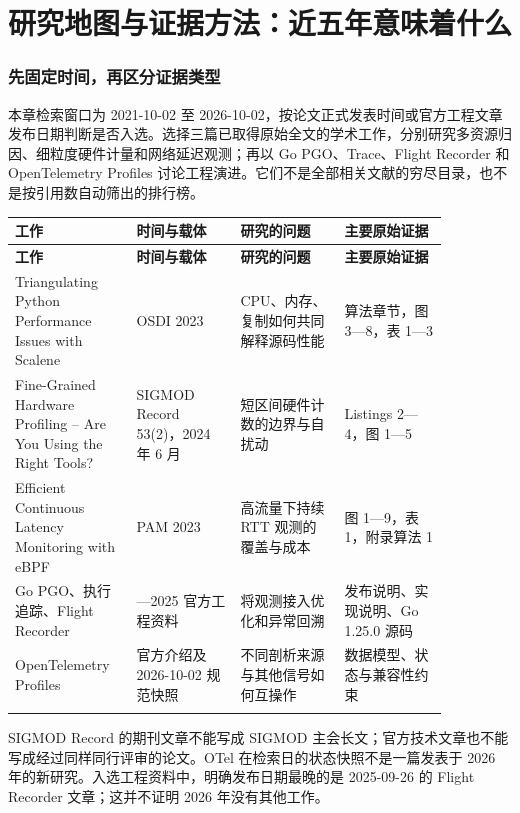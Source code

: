 \documentclass[UTF8,fontset=fandol,openany,11pt]{ctexbook}
\begin{document}
\section{研究地图与证据方法：近五年意味着什么}
\subsubsection{先固定时间，再区分证据类型}
本章检索窗口为 2021-10-02 至 2026-10-02，按论文正式发表时间或官方工程文章发布日期判断是否入选。选择三篇已取得原始全文的学术工作，分别研究多资源归因、细粒度硬件计量和网络延迟观测；再以 Go PGO、Trace、Flight Recorder 和 OpenTelemetry Profiles 讨论工程演进。它们不是全部相关文献的穷尽目录，也不是按引用数自动筛出的排行榜。

\begingroup\small\setlength{\tabcolsep}{4pt}
\begin{longtable}{>{\raggedright\arraybackslash}p{0.215\linewidth}>{\raggedright\arraybackslash}p{0.215\linewidth}>{\raggedright\arraybackslash}p{0.215\linewidth}>{\raggedright\arraybackslash}p{0.215\linewidth}}
\toprule
\textbf{工作} & \textbf{时间与载体} & \textbf{研究的问题} & \textbf{主要原始证据} \\
\midrule
\endfirsthead
\toprule
\textbf{工作} & \textbf{时间与载体} & \textbf{研究的问题} & \textbf{主要原始证据} \\
\midrule
\endhead
Triangulating Python Performance Issues with Scalene & OSDI 2023 & CPU、内存、复制如何共同解释源码性能 & 算法章节，图 3—8，表 1—3 \\
\addlinespace[3pt]
Fine-Grained Hardware Profiling – Are You Using the Right Tools? & SIGMOD Record 53(2)，2024 年 6 月 & 短区间硬件计数的边界与自扰动 & Listings 2—4，图 1—5 \\
\addlinespace[3pt]
Efficient Continuous Latency Monitoring with eBPF & PAM 2023 & 高流量下持续 RTT 观测的覆盖与成本 & 图 1—9，表 1，附录算法 1 \\
\addlinespace[3pt]
Go PGO、执行追踪、Flight Recorder & 2023—2025 官方工程资料 & 将观测接入优化和异常回溯 & 发布说明、实现说明、Go 1.25.0 源码 \\
\addlinespace[3pt]
OpenTelemetry Profiles & 2024 官方介绍及 2026-10-02 规范快照 & 不同剖析来源与其他信号如何互操作 & 数据模型、状态与兼容性约束 \\
\addlinespace[3pt]
\bottomrule
\end{longtable}
\endgroup
SIGMOD Record 的期刊文章不能写成 SIGMOD 主会长文；官方技术文章也不能写成经过同样同行评审的论文。OTel 在检索日的状态快照不是一篇发表于 2026 年的新研究。入选工程资料中，明确发布日期最晚的是 2025-09-26 的 Flight Recorder 文章；这并不证明 2026 年没有其他工作。
\end{document}
